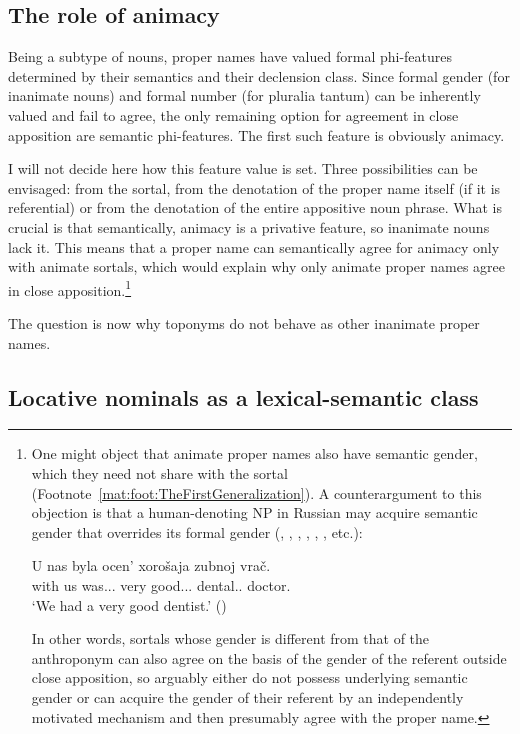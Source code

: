 \documentclass[output=paper,colorlinks,citecolor=brown]{langscibook}
\begin{document}
\subsection{The role of animacy}\label{mat:sec:role-of-animacy}

Being a subtype of nouns, proper names have valued formal phi-features determined by their semantics and their declension class. Since formal gender (for inanimate nouns) and formal number (for pluralia tantum) can be inherently valued and fail to agree, the only remaining option for agreement in close apposition are semantic phi-features. The first such feature is obviously animacy.

I will not decide here how this feature value is set. Three possibilities can be envisaged: from the sortal, from the denotation of the proper name itself (if it is referential) or from the denotation of the entire appositive noun phrase. What is crucial is that semantically, animacy is a privative feature, so inanimate nouns lack it. This means that a proper name can semantically agree for animacy only with animate sortals, which would explain why only animate proper names agree in close apposition.\footnote{\label{mat:foot:OneMightObject}One might object that animate proper names also have semantic gender, which they need not share with the sortal (Footnote~\ref{mat:foot:TheFirstGeneralization}). A counterargument to this objection is that a human-denoting NP in Russian may acquire semantic gender that overrides its formal gender (\citealt{Crockett1976}, \citealt{Corbett1979}, \citealt{Rothstein1980}, \citealt{Nikunlassi2000}, \citealt{Asarina2008}, \citealt{Pesetsky2013}, etc.):

\ea
\gll U	nas	byla	ocen'	xorošaja	zubnoj	vrač. \\
with	us	was.{\FEM.\SG.}	very	good.{\FEM.\SG.}	dental.{\MASC.\SG}	doctor.{\MASC}\\
\glt `We had a very good dentist.' \hfill (\citealt{Crockett1976})
\z

\noindent In other words, sortals whose gender is different from that of the anthroponym can also agree on the basis of the gender of the referent outside close apposition, so arguably either do not possess underlying semantic gender or can acquire the gender of their referent by an independently motivated mechanism and then presumably agree with the proper name.
}

The question is now why toponyms do not behave as other inanimate proper names.

\subsection{Locative nominals as a lexical-semantic class}\label{mat:sec:locative-nominals-as-lexical-semantic-class}
\end{document}
